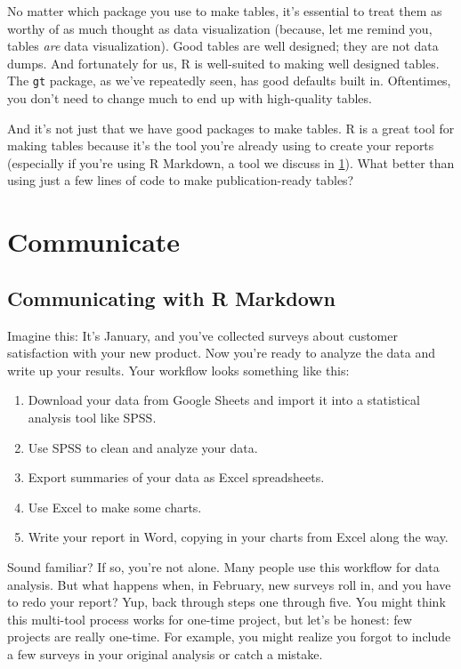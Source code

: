 \documentclass[
]{book}
\providecommand{\tightlist}{%
  \setlength{\itemsep}{0pt}\setlength{\parskip}{0pt}}
\begin{document}
No matter which package you use to make tables, it's essential to treat them as worthy of as much thought as data visualization (because, let me remind you, tables \emph{are} data visualization). Good tables are well designed; they are not data dumps. And fortunately for us, R is well-suited to making well designed tables. The \texttt{gt} package, as we've repeatedly seen, has good defaults built in. Oftentimes, you don't need to change much to end up with high-quality tables.

And it's not just that we have good packages to make tables. R is a great tool for making tables because it's the tool you're already using to create your reports (especially if you're using R Markdown, a tool we discuss in \ref{rmarkdown-chapter}). What better than using just a few lines of code to make publication-ready tables?

\hypertarget{part-communicate}{%
\part*{Communicate}\label{part-communicate}}

\hypertarget{rmarkdown-chapter}{%
\chapter{Communicating with R Markdown}\label{rmarkdown-chapter}}

Imagine this: It's January, and you've collected surveys about customer satisfaction with your new product. Now you're ready to analyze the data and write up your results. Your workflow looks something like this:

\begin{enumerate}
\def\labelenumi{\arabic{enumi}.}
\tightlist
\item
  Download your data from Google Sheets and import it into a statistical analysis tool like SPSS.
\item
  Use SPSS to clean and analyze your data.
\item
  Export summaries of your data as Excel spreadsheets.
\item
  Use Excel to make some charts.
\item
  Write your report in Word, copying in your charts from Excel along the way.
\end{enumerate}

Sound familiar? If so, you're not alone. Many people use this workflow for data analysis. But what happens when, in February, new surveys roll in, and you have to redo your report? Yup, back through steps one through five. You might think this multi-tool process works for one-time project, but let's be honest: few projects are really one-time. For example, you might realize you forgot to include a few surveys in your original analysis or catch a mistake.
\end{document}
